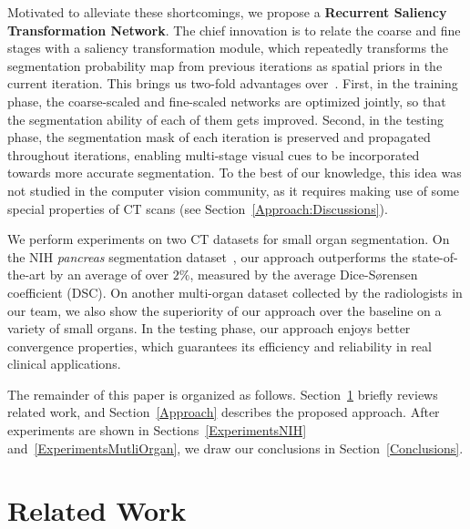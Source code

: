 \documentclass[10pt,twocolumn,letterpaper]{article}
\begin{document}
Motivated to alleviate these shortcomings, we propose a {\bf Recurrent Saliency Transformation Network}.
The chief innovation is to relate the coarse and fine stages with a saliency transformation module,
which repeatedly transforms the segmentation probability map from previous iterations as spatial priors in the current iteration.
This brings us two-fold advantages over~\cite{Zhou_2017_Fixed}.
First, in the training phase, the coarse-scaled and fine-scaled networks are optimized jointly,
so that the segmentation ability of each of them gets improved.
Second, in the testing phase, the segmentation mask of each iteration is preserved and propagated throughout iterations,
enabling multi-stage visual cues to be incorporated towards more accurate segmentation.
To the best of our knowledge, this idea was not studied in the computer vision community,
as it requires making use of some special properties of CT scans (see Section~\ref{Approach:Discussions}).

We perform experiments on two CT datasets for small organ segmentation.
On the NIH {\em pancreas} segmentation dataset~\cite{Roth_2015_DeepOrgan},
our approach outperforms the state-of-the-art by an average of over $2\%$,
measured by the average Dice-S{\o}rensen coefficient (DSC).
On another multi-organ dataset collected by the radiologists in our team,
we also show the superiority of our approach over the baseline on a variety of small organs.
In the testing phase, our approach enjoys better convergence properties,
which guarantees its efficiency and reliability in real clinical applications.

The remainder of this paper is organized as follows.
Section~\ref{RelatedWork} briefly reviews related work, and Section~\ref{Approach} describes the proposed approach.
After experiments are shown in Sections~\ref{ExperimentsNIH} and~\ref{ExperimentsMutliOrgan},
we draw our conclusions in Section~\ref{Conclusions}.


\section{Related Work}
\label{RelatedWork}
\end{document}
